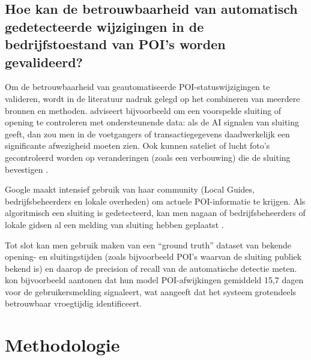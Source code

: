 \subsection{Hoe kan de betrouwbaarheid van automatisch gedetecteerde wijzigingen in de bedrijfstoestand van POI’s worden gevalideerd?}
Om de betrouwbaarheid van geautomatiseerde POI-statuswijzigingen te valideren, wordt in de literatuur nadruk gelegd op het combineren van meerdere bronnen en methoden. \textcite{Taylor2022} adviseert bijvoorbeeld om een voorspelde sluiting of opening te controleren met ondersteunende data: als de AI signalen van sluiting geeft, dan zou men in de voetgangers of transactiegegevens daadwerkelijk een significante afwezigheid moeten zien. Ook kunnen sateliet of lucht foto’s gecontroleerd worden op veranderingen (zoals een verbouwing) die de sluiting bevestigen \autocite{Taylor2022}.

Google maakt intensief gebruik van haar community (Local Guides, bedrijfsbeheerders en lokale overheden) om actuele POI-informatie te krijgen. Als algoritmisch een sluiting is gedetecteerd, kan men nagaan of bedrijfsbeheerders of lokale gidsen al een melding van sluiting hebben geplaatst \autocite{Pericolosi2022}.

Tot slot kan men gebruik maken van een “ground truth” dataset van bekende opening- en sluitingstijden (zoals bijvoorbeeld POI’s waarvan de sluiting publiek bekend is) en daarop de precision of recall van de automatische detectie meten. \textcite{Yao2024} kon bijvoorbeeld aantonen dat hun model POI-afwijkingen gemiddeld 15,7 dagen voor de gebruikersmelding signaleert, wat aangeeft dat het systeem grotendeels betrouwbaar vroegtijdig identificeert.

\section{Methodologie}%
\label{sec:methodologie}



